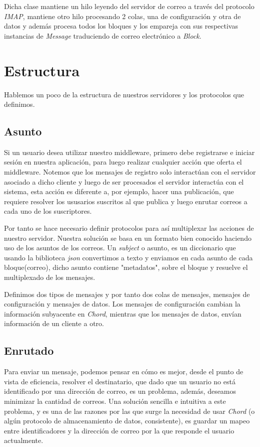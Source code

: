 \documentclass[a4paper]{article}
\begin{document}
	Dicha clase mantiene un hilo leyendo del servidor de correo a través del protocolo \emph{IMAP}, mantiene otro hilo procesando 2 colas, una de configuración y otra de datos y además procesa todos los bloques y los empareja con sus respectivas instancias de \emph{Message} traduciendo de correo electrónico a \emph{Block}.
	
\section{Estructura}\label{sec:estructura}
Hablemos un poco de la estructura de nuestros servidores y los protocolos que definimos.

	\subsection{Asunto}\label{subsec:asunto}
	Si un usuario desea utilizar nuestro middleware, primero debe registrarse e iniciar sesión en nuestra aplicación, para luego realizar cualquier acción que oferta el middleware.
	Notemos que los mensajes de registro solo interactúan con el servidor asociado a dicho cliente y luego de ser procesados el servidor interactúa con el sistema, esta acción es diferente a, por ejemplo, hacer una publicación, que requiere resolver los ususarios suscritos al que publica y luego enrutar correos a cada uno de los suscriptores.
	 
	Por tanto se hace necesario definir protocolos para así multiplexar las acciones de nuestro servidor.
	Nuestra solución se basa en un formato bien conocido haciendo uso de los asuntos de los correos.
	Un \emph{subject} o asunto, es un diccionario que usando la biblioteca \emph{json} convertimos a texto y enviamos en cada asunto de cada bloque(correo), dicho asunto contiene "metadatos", sobre el bloque y resuelve el multiplexado de los mensajes.
	
	Definimos dos tipos de mensajes y por tanto dos colas de mensajes, mensajes de configuración y mensajes de datos.
	Los mensajes de configuración cambian la información subyacente en \emph{Chord}, mientras que los mensajes de datos, envían información de un cliente a otro.
	
	 
	\subsection{Enrutado}\label{subsec:enrutado}
	Para enviar un mensaje, podemos pensar en cómo es mejor, desde el punto de vista de eficiencia, resolver el destinatario, que dado que un usuario no está identificado por una dirección de correo, es un problema, además, deseamos minimizar la cantidad de correos.
	Una solución sencilla e intuitiva a este problema, y es una de las razones por las que surge la necesidad de usar \emph{Chord} (o algún protocolo de almacenamiento de datos, consistente), es guardar un mapeo entre identificadores y la dirección de correo por la que responde el usuario actualmente.
	
\end{document}
